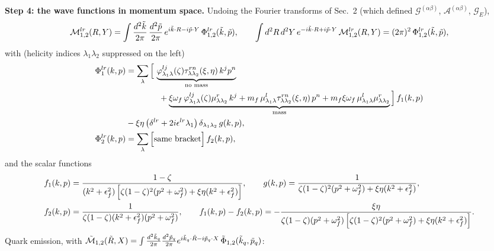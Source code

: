 \documentclass[9pt]{article}
\numberwithin{equation}{section}
\begin{document}
\noindent\textbf{Step 4: the wave functions in momentum space.} Undoing the Fourier transforms of Sec.~2 (which defined $\mathcal{G}^{(\alpha\beta)}$, $\mathcal{A}^{(\alpha\beta)}$, $\mathcal{G}_{E}$),
\begin{align}
\mathcal{M}^{lr}_{1,2}(R,Y) = \int\frac{d^{2}\Tilde{k}}{2\pi}\,\frac{d^{2}\Tilde{p}}{2\pi}\,e^{i\Tilde{k}\cdot R-i\Tilde{p}\cdot Y}\,\Phi^{lr}_{1,2}(\Tilde{k},\Tilde{p}),\hspace{2em} \int d^{2}R\,d^{2}Y\,e^{-i\Tilde{k}\cdot R+i\Tilde{p}\cdot Y}\,\mathcal{M}^{lr}_{1,2}(R,Y) = (2\pi)^{2}\,\Phi^{lr}_{1,2}(\Tilde{k},\Tilde{p}),
\end{align}
with (helicity indices $\lambda_{1}\lambda_{2}$ suppressed on the left)
\begin{align}\label{eq:Phiel}
\Phi^{lr}_{1}(k,p) & = \sum_{\lambda}\Big[\,\underbrace{\varphi^{lj}_{\lambda_{1}\lambda}(\zeta)\tau^{rn}_{\lambda\lambda_{2}}(\xi,\eta)\,k^{j}p^{n}}_{\text{no mass}}\notag \\ & \hspace{4em}+\underbrace{\xi\omega_{f}\,\varphi^{lj}_{\lambda_{1}\lambda}(\zeta)\mu^{r}_{\lambda\lambda_{2}}\,k^{j}+m_{f}\,\mu^{l}_{\lambda_{1}\lambda}\tau^{rn}_{\lambda\lambda_{2}}(\xi,\eta)\,p^{n}+m_{f}\xi\omega_{f}\,\mu^{l}_{\lambda_{1}\lambda}\mu^{r}_{\lambda\lambda_{2}}}_{\text{mass}}\Big]\,f_{1}(k,p)\notag \\ & -\xi\eta\left(\delta^{lr}+2i\epsilon^{lr}\lambda_{1}\right)\delta_{\lambda_{1}\lambda_{2}}\,g(k,p),\notag \\
\Phi^{lr}_{2}(k,p) & = \sum_{\lambda}\Big[\text{same bracket}\Big]\,f_{2}(k,p),
\end{align}
and the scalar functions
\begin{align}\label{eq:f12}
f_{1}(k,p) & = \frac{1-\zeta}{(k^{2}+\epsilon^{2}_{f})\left[\zeta(1-\zeta)^{2}(p^{2}+\omega^{2}_{f})+\xi\eta(k^{2}+\epsilon^{2}_{f})\right]},\hspace{2em} g(k,p) = \frac{1}{\zeta(1-\zeta)^{2}(p^{2}+\omega^{2}_{f})+\xi\eta(k^{2}+\epsilon^{2}_{f})},\notag \\
f_{2}(k,p) & = \frac{1}{\zeta(1-\zeta)(k^{2}+\epsilon^{2}_{f})(p^{2}+\omega^{2}_{f})},\hspace{2em} f_{1}(k,p)-f_{2}(k,p) = -\frac{\xi\eta}{\zeta(1-\zeta)(p^{2}+\omega^{2}_{f})\left[\zeta(1-\zeta)^{2}(p^{2}+\omega^{2}_{f})+\xi\eta(k^{2}+\epsilon^{2}_{f})\right]}.
\end{align}
Quark emission, with $\Tilde{\mathcal{M}}_{1,2}(\Tilde{R},X)=\int\frac{d^{2}\Tilde{k}_{q}}{2\pi}\frac{d^{2}\Tilde{p}_{q}}{2\pi}e^{i\Tilde{k}_{q}\cdot\Tilde{R}-i\Tilde{p}_{q}\cdot X}\,\Tilde{\Phi}_{1,2}(\Tilde{k}_{q},\Tilde{p}_{q})$:
\end{document}
